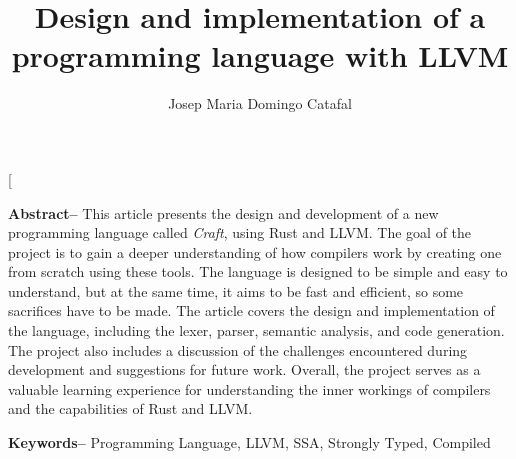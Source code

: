 ﻿\documentclass[10pt,a4paper,twocolumn,twoside]{article}
\author{\LARGE\sffamily Josep Maria Domingo Catafal}
\title{\Huge{\sffamily  Design and implementation of a programming language with LLVM }}
\date{}
\begin{document}
\fancyhead[RO]{\thepage}
\fancyhead[LE]{\thepage}

\fancyfoot[CO,CE]{}

{
   \fancyhf{}
}

\renewcommand{\headrulewidth}{0pt}
\renewcommand{\footrulewidth}{0pt}
\pagestyle{fancy}

\twocolumn[\begin{@twocolumnfalse}

\maketitle

\thispagestyle{primerapagina}

\begin{center}
\parbox{0.915\textwidth}
{\sffamily

    \textbf{Abstract--} This article presents the design and development of a new
    programming language called \textit{Craft}, using Rust and LLVM. The goal of
    the project is to gain a deeper understanding of how compilers work by
    creating one from scratch using these tools. The language is designed to be
    simple and easy to understand, but at the same time, it aims to be fast and
    efficient, so some sacrifices have to be made. The article covers the design
    and implementation of the language, including the lexer, parser, semantic
    analysis, and code generation. The project also includes a discussion of the
    challenges encountered during development and suggestions for future work.
    Overall, the project serves as a valuable learning experience for
    understanding the inner workings of compilers and the capabilities of Rust
    and LLVM.

    \bigskip

    \textbf{Keywords-- } Programming Language, LLVM, SSA, Strongly Typed, Compiled

    \bigskip

}
\end{center}
\end{@twocolumnfalse}
\end{document}
